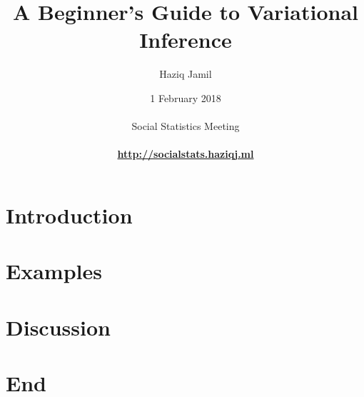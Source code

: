 \documentclass[xcolor={dvipsnames}, handout]{beamer}  %
\begin{document}

\title[Variational inference]{A Beginner's Guide to Variational Inference}
\author[Haziq Jamil]{
  \large{Haziq Jamil}\\ 
}
\date[1 Feb 2018]{
  1 February 2018\\
  \hspace{1cm}\\
  Social Statistics Meeting\\
  \hspace{1cm}\\
  \href{http://socialstats.haziqj.ml}{\color{fu-red!60} \textbf{http://socialstats.haziqj.ml}}
}

\mytitle


\mytoc


\section{Introduction}


\section[Examples]{Examples}
\transition


\section{Discussion}
\transition


\section*{End}
\thankyou
\end{document}
